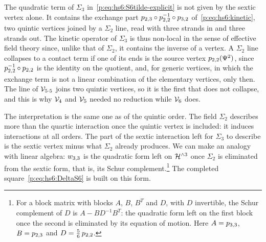 The quadratic term of $\Sigma_3$ in~\eqref{p:eq:hs6:S6tilde-explicit} is not given by the sextic vertex alone.
It contains the exchange part $p_{2,3} \circ p_{2,2}^{-1} \circ p_{3,2}$ of~\eqref{p:eq:hs6:kinetic}, two quintic vertices joined by a $\Sigma_2$ line, read with three strands in and three strands out.
The kinetic operator of $\Sigma_3$ is thus non-local in the sense of effective field theory since, unlike that of $\Sigma_2$, it contains the inverse of a vertex.
A $\Sigma_2$ line collapses to a contact term if one of its ends is the source vertex $p_{2,2}(\Psi^2)$, since $p_{2,2}^{-1} \circ p_{2,2}$ is the identity on the quotient, and, for generic vertices, in which the exchange term is not a linear combination of the elementary vertices, only then.
  The line of $\mathcal{V}_{5 \cdot 5}$ joins two quintic vertices, so it is the first that does not collapse, and this is why $\mathcal{V}_{4}$ and $\mathcal{V}_{5}$ needed no reduction while $\mathcal{V}_{6}$ does.

The interpretation is the same one as of the quintic order.
The field $\Sigma_2$ describes more than the quartic interaction once the quintic vertex is included: it induces interactions at all orders.
The part of the sextic interaction left for $\Sigma_3$ to describe is the sextic vertex minus what $\Sigma_2$ already produces.
We can make an analogy with linear algebra: $w_{3,3}$ is the quadratic form left on $\mathcal{H}^{\wedge 3}$ once $\Sigma_2$ is eliminated from the sextic form, that is, its Schur complement.\footnote{
    For a block matrix with blocks $A$, $B$, $B^T$ and $D$, with $D$ invertible, the Schur complement of $D$ is $A - B D^{-1} B^T$: the quadratic form left on the first block once the second is eliminated by its equation of motion.
    Here $A = p_{3,3}$, $B = p_{2,3}$ and $D = \tfrac{5}{6} \, p_{2,2}$.
  }
  The completed square~\eqref{p:eq:hs6:DeltaS6} is built on this form.

